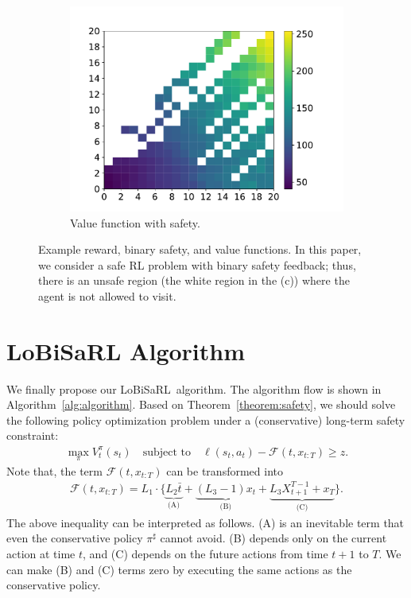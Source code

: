 \documentclass[letterpaper]{article} %
\newcommand{\algo}{\textsf{LoBiSaRL}}
\begin{document}
\begin{figure}[t]
\begin{subfigure}[b]{0.33\textwidth}
        \centering
        \includegraphics[width=\textwidth]{figures/value.pdf}
        \caption{Value function with safety.}
        \label{fig:value}
    \end{subfigure}
    \caption{Example reward, binary safety, and value functions. In this paper, we consider a safe RL problem with binary safety feedback; thus, there is an unsafe region (the white region in the (c)) where the agent is not allowed to visit.}
    \label{fig:experiment}
\end{figure}

\section{LoBiSaRL Algorithm}
\label{sec:method}

We finally propose our \algo~algorithm.
The algorithm flow is shown in Algorithm~\ref{alg:algorithm}.
Based on Theorem~\ref{theorem:safety}, we should solve the following policy optimization problem under a (conservative) long-term safety constraint:
%
\begin{align*}
    \max_\pi V_t^\pi(s_t) \quad \text{subject to} \quad \ell(s_t, a_t) - \mathcal{F}(t, x_{t:T}) \ge z.
\end{align*}
%
Note that, the term $\mathcal{F}(t, x_{t:T})$ can be transformed into
%
\begin{align*}
\mathcal{F}(t, x_{t:T}) = L_1 \cdot \biggl\{
\underbrace{L_2 \bar{t}}_{\text{(A)}}
+ \underbrace{(L_3-1) x_t}_{\text{(B)}}
+ \underbrace{L_3 X_{t+1}^{T-1} + x_{T}}_{\text{(C)}} \biggr\}.
\end{align*}
%
The above inequality can be interpreted as follows.
(A) is an inevitable term that even the conservative policy $\pi^\sharp$ cannot avoid.
(B) depends only on the current action at time $t$, and (C) depends on the future actions from time $t+1$ to $T$.
We can make (B) and (C) terms zero by executing the same actions as the conservative policy.
\end{document}
